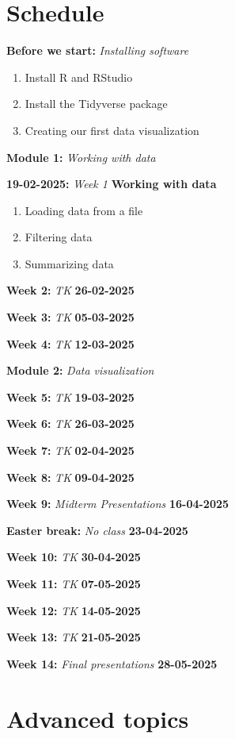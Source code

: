 \documentclass{article}
\newcommand{\week}[3]{
    \begin{center}
        \textbf{#1:} \textit{#2} \dotfill \textbf{#3}
    \end{center}
}
\newcommand{\module}[2]{
    \large
    \textbf{#1:} \textit{#2}
    \normalsize
}
\begin{document}
\section*{Schedule}

\module{Before we start}{Installing software}
\begin{enumerate}
    \item Install R and RStudio
    \item Install the Tidyverse package
    \item Creating our first data visualization
\end{enumerate}

\module{Module 1}{Working with data}

\week{19-02-2025}{Week 1}{Working with data}

\begin{enumerate}
    \item Loading data from a file
    \item Filtering data
    \item Summarizing data
\end{enumerate}

\week{Week 2}{TK}{26-02-2025}
\week{Week 3}{TK}{05-03-2025}
\week{Week 4}{TK}{12-03-2025}
\module{Module 2}{Data visualization}
\week{Week 5}{TK}{19-03-2025}
\week{Week 6}{TK}{26-03-2025}
\week{Week 7}{TK}{02-04-2025}
\week{Week 8}{TK}{09-04-2025}
\week{Week 9}{Midterm Presentations}{16-04-2025}
\week{Easter break}{No class}{23-04-2025}

\week{Week 10}{TK}{30-04-2025}
\week{Week 11}{TK}{07-05-2025}
\week{Week 12}{TK}{14-05-2025}
\week{Week 13}{TK}{21-05-2025}
\week{Week 14}{Final presentations}{28-05-2025}


\section{Advanced topics}
\end{document}
